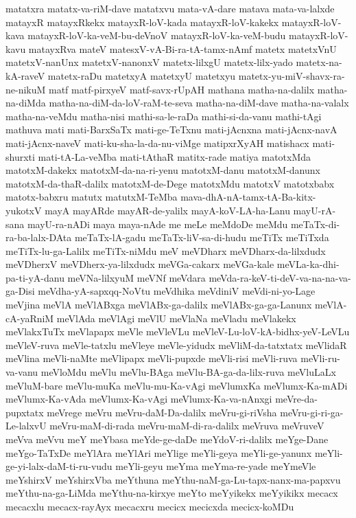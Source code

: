 {matatxra
matatx-va-riM-dave
matatxvu
mata-vA-dare
matava
mata-va-lalxde
matayxR
matayxRkekx
matayxR-loV-kada
matayxR-loV-kakekx
matayxR-loV-kava
matayxR-loV-ka-veM-bu-deVnoV
matayxR-loV-ka-veM-budu
matayxR-loV-kavu
matayxRva
mateV
matesxV-vA-Bi-ra-tA-tamx-nAmf
matetx
matetxVnU
matetxV-nanUnx
matetxV-nanonxV
matetx-lilxgU
matetx-lilx-yado
matetx-na-kA-raveV
matetx-raDu
matetxyA
matetxyU
matetxyu
matetx-yu-miV-shavx-ra-ne-nikuM
matf
matf-pirxyeV
matf-savx-rUpAH
mathana
matha-na-dalilx
matha-na-diMda
matha-na-diM-da-loV-raM-te-seva
matha-na-diM-dave
matha-na-valalx
matha-na-veMdu
matha-nisi
mathi-sa-le-raDa
mathi-si-da-vanu
mathi-tAgi
mathuva
mati
mati-BarxSaTx
mati-ge-TeTxnu
mati-jAcnxna
mati-jAcnx-navA
mati-jAcnx-naveV
mati-ku-sha-la-da-nu-viMge
matipxrXyAH
matishacx
mati-shurxti
mati-tA-La-veMba
mati-tAthaR
matitx-rade
matiya
matotxMda
matotxM-dakekx
matotxM-da-na-ri-yenu
matotxM-danu
matotxM-danunx
matotxM-da-thaR-dalilx
matotxM-de-Dege
matotxMdu
matotxV
matotxbabx
matotx-babxru
matutx
matutxM-TeMba
mava-dhA-nA-tamx-tA-Ba-kitx-yukotxV
mayA
mayARde
mayAR-de-yalilx
mayA-koV-LA-ha-Lanu
mayU-rA-sana
mayU-ra-nADi
maya
maya-nAde
me
meLe
meMdoDe
meMdu
meTaTx-di-ra-ba-lalx-DAta
meTaTx-lA-gadu
meTaTx-liV-sa-di-hudu
meTiTx
meTiTxda
meTiTx-lu-ga-Lalilx
meTiTx-niMdu
meV
meVDharx
meVDharx-da-lilxdudx
meVDherxV
meVDherx-ya-lilxdudx
meVGa-cakarx
meVGa-kale
meVLa-ka-dhi-pa-ti-yA-danu
meVNa-lilxyuM
meVNf
meVdara
meVda-ra-keV-ti-deV-va-na-na-va-ga-Disi
meVdha-yA-sapxqq-NoVtu
meVdhika
meVdiniV
meVdi-ni-yo-Lage
meVjina
meVlA
meVlABxga
meVlABx-ga-dalilx
meVlABx-ga-ga-Lanunx
meVlA-cA-yaRniM
meVlAda
meVlAgi
meVlU
meVlaNa
meVladu
meVlakekx
meVlakxTuTx
meVlapapx
meVle
meVleVLu
meVleV-Lu-loV-kA-bidhx-yeV-LeVLu
meVleV-ruva
meVle-tatxlu
meVleye
meVle-yidudx
meVliM-da-tatxtatx
meVlidaR
meVlina
meVli-naMte
meVlipapx
meVli-pupxde
meVli-risi
meVli-ruva
meVli-ru-va-vanu
meVloMdu
meVlu
meVlu-BAga
meVlu-BA-ga-da-lilx-ruva
meVluLaLx
meVluM-bare
meVlu-muKa
meVlu-mu-Ka-vAgi
meVlumxKa
meVlumx-Ka-mADi
meVlumx-Ka-vAda
meVlumx-Ka-vAgi
meVlumx-Ka-va-nAnxgi
meVre-da-pupxtatx
meVrege
meVru
meVru-daM-Da-dalilx
meVru-gi-riVsha
meVru-gi-ri-ga-Le-lalxvU
meVru-maM-di-rada
meVru-maM-di-ra-dalilx
meVruva
meVruveV
meVva
meVvu
meY
meYbasa
meYde-ge-daDe
meYdoV-ri-dalilx
meYge-Dane
meYgo-TaTxDe
meYlAra
meYlAri
meYlige
meYli-geya
meYli-ge-yanunx
meYli-ge-yi-lalx-daM-ti-ru-vudu
meYli-geyu
meYma
meYma-re-yade
meYmeVle
meYshirxV
meYshirxVba
meYthuna
meYthu-naM-ga-Lu-tapx-nanx-ma-papxvu
meYthu-na-ga-LiMda
meYthu-na-kirxye
meYto
meYyikekx
meYyikikx
mecacx
mecacxlu
mecacx-rayAyx
mecacxru
mecicx
mecicxda
mecicx-koMDu
}
